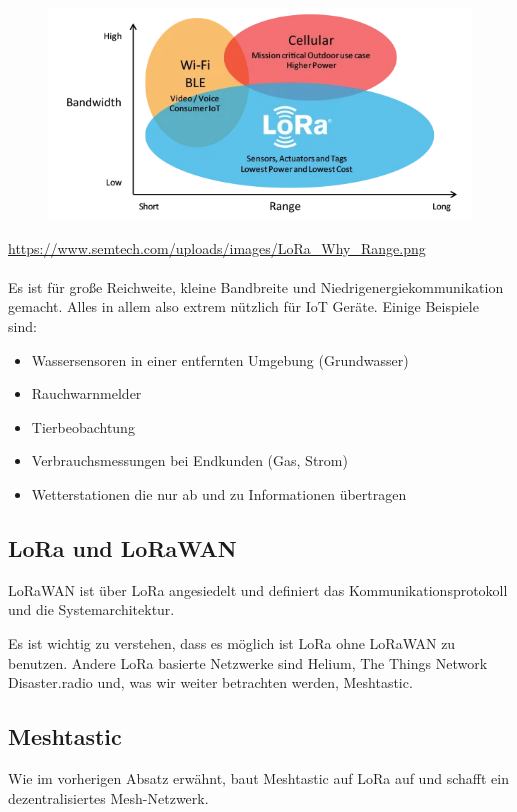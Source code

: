 \documentclass[12pt,a4paper]{article}
\begin{document}
\begin{figure}[h]
	\includegraphics[scale=0.7]{bandwidth-vs-range.png}
\end{figure}
\url{https://www.semtech.com/uploads/images/LoRa_Why_Range.png}\\ \\
Es ist für große Reichweite, kleine Bandbreite und Niedrigenergiekommunikation gemacht. Alles in allem also extrem nützlich für IoT Geräte. Einige Beispiele sind:

\begin{itemize}
	\item Wassersensoren in einer entfernten Umgebung (Grundwasser)
	\item Rauchwarnmelder
	\item Tierbeobachtung
	\item Verbrauchsmessungen bei Endkunden (Gas, Strom)
	\item Wetterstationen die nur ab und zu Informationen übertragen
\end{itemize}
\newpage
\subsection{LoRa und LoRaWAN}

LoRaWAN ist über LoRa angesiedelt und definiert das Kommunikationsprotokoll und die Systemarchitektur.

Es ist wichtig zu verstehen, dass es möglich ist LoRa ohne LoRaWAN zu benutzen. Andere LoRa basierte Netzwerke sind Helium, The Things Network Disaster.radio und, was wir weiter betrachten werden, Meshtastic.

\subsection{Meshtastic}
Wie im vorherigen Absatz erwähnt, baut Meshtastic auf LoRa auf und schafft ein dezentralisiertes Mesh-Netzwerk.
\end{document}
